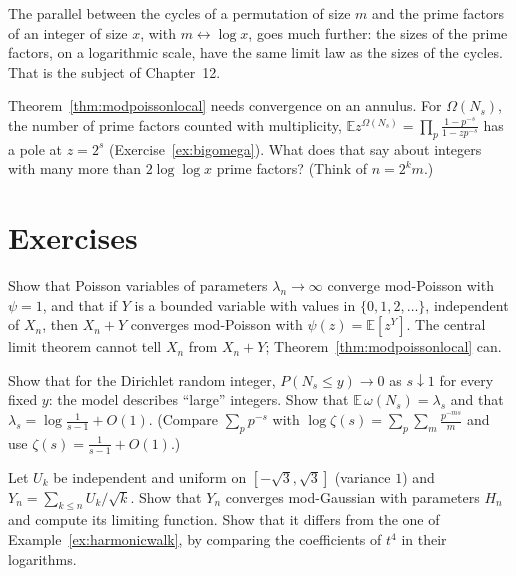 The parallel between the cycles of a permutation of size $m$ and the prime factors of an integer of size $x$, with $m\leftrightarrow\log x$, goes much further: the sizes of the prime factors, on a logarithmic scale, have the same limit
law as the sizes of the cycles. That is the subject of Chapter~12.

\begin{think}
Theorem~\ref{thm:modpoissonlocal} needs convergence on an annulus. For $\Omega(N_s)$, the number of prime factors counted with multiplicity, $\mathbb Ez^{\Omega(N_s)}=\prod_p\frac{1-p^{-s}}{1-zp^{-s}}$ has a pole at $z=2^s$ (Exercise~\ref{ex:bigomega}). What does that
say about integers with many more than $2\log\log x$ prime factors? (Think of $n=2^km$.)
\end{think}

\section{Exercises}

\begin{exercise}[$\star$]\label{ex:shift}
Show that Poisson variables of parameters $\lambda_n\to\infty$ converge mod-Poisson with $\psi=1$, and that if $Y$ is a bounded variable with values in $\{0,1,2,\dots\}$, independent of $X_n$, then $X_n+Y$ converges mod-Poisson with $\psi(z)=\mathbb E[z^Y]$.
The central limit theorem cannot tell $X_n$ from $X_n+Y$; Theorem~\ref{thm:modpoissonlocal} can.
\end{exercise}

\begin{exercise}[$\star$]\label{ex:lambdas}
Show that for the Dirichlet random integer, $P(N_s\le y)\to0$ as $s\downarrow1$ for every fixed $y$: the model describes ``large'' integers. Show that $\mathbb E\,\omega(N_s)=\lambda_s$ and that $\lambda_s=\log\frac1{s-1}+O(1)$. (Compare $\sum_pp^{-s}$ with
$\log\zeta(s)=\sum_p\sum_m\frac{p^{-ms}}m$ and use $\zeta(s)=\frac1{s-1}+O(1)$.)
\end{exercise}

\begin{exercise}[$\star\star$]\label{ex:residues}
Let $U_k$ be independent and uniform on $[-\sqrt3,\sqrt3]$ (variance $1$) and $Y_n=\sum_{k\le n}U_k/\sqrt k$. Show that $Y_n$ converges mod-Gaussian with parameters $H_n$ and compute its limiting function. Show that it differs from the one of
Example~\ref{ex:harmonicwalk}, by comparing the coefficients of $t^4$ in their logarithms.
\end{exercise}

